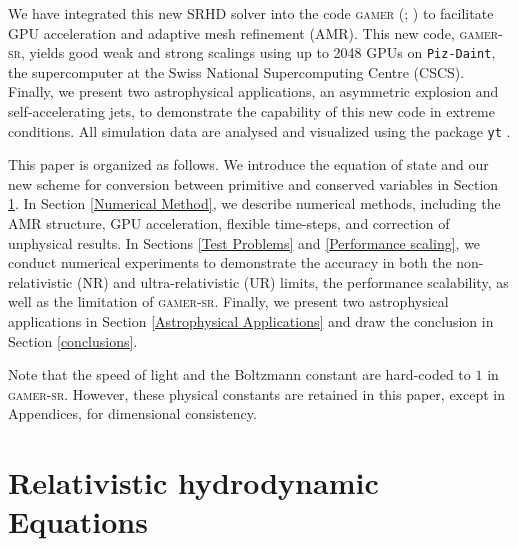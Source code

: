 \documentclass[twocolumn]{aastex63}
\begin{document}
 We have integrated this new SRHD solver into the code \textsc{gamer} (\citealt{gamer-1}; \citealt{gamer-2}) to facilitate GPU acceleration and adaptive mesh refinement (AMR). This new code, \textsc{gamer-sr}, yields good weak and strong scalings using up to 2048 GPUs on \texttt{Piz-Daint}, the supercomputer at the Swiss National Supercomputing Centre (CSCS). Finally, we present two astrophysical applications, an asymmetric explosion and self-accelerating jets, to demonstrate the capability of this new code in extreme conditions. All simulation data are analysed and visualized using the package \texttt{yt} \citep{YT}.

 This paper is organized as follows. We introduce the equation of state and our new scheme for conversion between primitive and conserved variables in Section \ref{Relativistic Hydrodynamic Equations}. In Section \ref{Numerical Method}, we describe numerical methods, including the AMR structure, GPU acceleration, flexible time-steps, and correction of unphysical results. In Sections \ref{Test Problems} and \ref{Performance scaling}, we conduct numerical experiments to demonstrate the accuracy in both the non-relativistic (NR) and ultra-relativistic (UR) limits, the performance scalability, as well as the limitation of \textsc{gamer-sr}. Finally, we present two astrophysical applications in Section \ref{Astrophysical Applications} and draw the conclusion in Section \ref{conclusions}.

 Note that the speed of light and the Boltzmann constant are hard-coded to $1$ in \textsc{gamer-sr}. However, these physical constants are retained in this paper, except in Appendices, for dimensional consistency.

\section{Relativistic hydrodynamic Equations}
\label{Relativistic Hydrodynamic Equations}
\end{document}
